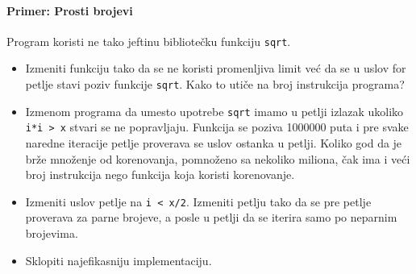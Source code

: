 \paragraph{Primer: Prosti brojevi}\label{primer-prosti-brojevi}

Program koristi ne tako jeftinu bibliotečku funkciju \texttt{sqrt}.

\begin{itemize}
\tightlist
\item
  Izmeniti funkciju tako da se ne koristi promenljiva limit već da se u uslov for petlje stavi poziv funkcije \texttt{sqrt}. Kako to utiče na broj instrukcija programa?
\item
  Izmenom programa da umesto upotrebe \texttt{sqrt} imamo u petlji izlazak ukoliko \texttt{i*i\ \textgreater{}\ x} stvari se ne popravljaju. Funkcija se poziva 1000000 puta i pre svake naredne iteracije petlje proverava se uslov ostanka u petlji. Koliko god da je brže množenje od korenovanja, pomnoženo sa nekoliko miliona, čak ima i veći broj instrukcija nego funkcija koja koristi korenovanje.
\item
  Izmeniti uslov petlje na \texttt{i\ \textless{}\ x/2}. Izmeniti petlju tako da se pre petlje proverava za parne brojeve, a posle u petlji da se iterira samo po neparnim brojevima.
\item
  Sklopiti najefikasniju implementaciju.
\end{itemize}
